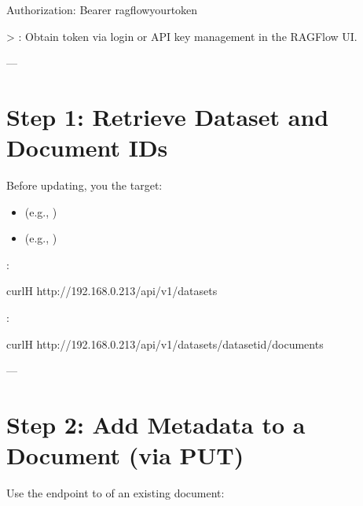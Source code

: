 \documentclass[letterpaper,10pt,english]{sphinxmanual}
\begin{document}
\begin{sphinxVerbatim}[commandchars=\\\{\}]
Authorization: Bearer ragflow\PYGZhy{}\PYGZlt{}your\PYGZhy{}token\PYGZgt{}
\end{sphinxVerbatim}

\sphinxAtStartPar
\textgreater{} : Obtain token via login or API key management in the RAGFlow UI.

\sphinxAtStartPar
—


\section{Step 1: Retrieve Dataset and Document IDs}
\label{\detokenize{api:step-1-retrieve-dataset-and-document-ids}}
\sphinxAtStartPar
Before updating, you  the target:
\begin{itemize}
\item {} 
\sphinxAtStartPar
{} (e.g., )

\item {} 
\sphinxAtStartPar
{} (e.g., )

\end{itemize}

\sphinxAtStartPar
{}:

\begin{sphinxVerbatim}[commandchars=\\\{\}]
curl\PYGZhy{}H
http://192.168.0.213/api/v1/datasets
\end{sphinxVerbatim}

\sphinxAtStartPar
{}:

\begin{sphinxVerbatim}[commandchars=\\\{\}]
curl\PYGZhy{}H
http://192.168.0.213/api/v1/datasets/\PYGZlt{}dataset\PYGZus{}id\PYGZgt{}/documents
\end{sphinxVerbatim}

\sphinxAtStartPar
—


\section{Step 2: Add Metadata to a Document (via PUT)}
\label{\detokenize{api:step-2-add-metadata-to-a-document-via-put}}
\sphinxAtStartPar
Use the  endpoint to  of an existing document:
\end{document}

